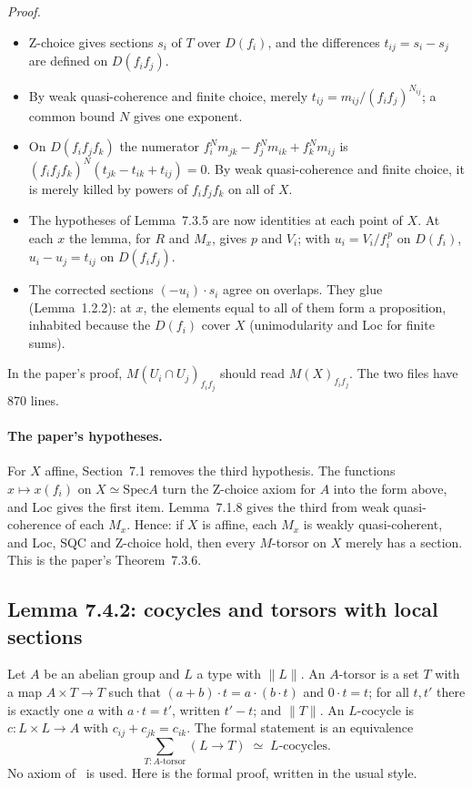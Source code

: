 \documentclass[11pt]{article}
\newcommand{\tr}[1]{\lVert #1\rVert}
\newcommand{\Spec}{\mathrm{Spec}}
\theoremstyle{remark}
\begin{document}
\emph{Proof.}
\begin{itemize}
\item Z-choice gives sections $s_i$ of $T$ over $D(f_i)$, and the
  differences $t_{ij}=s_i-s_j$ are defined on $D(f_if_j)$.
\item By weak quasi-coherence and finite choice, merely
  $t_{ij}=m_{ij}/(f_if_j)^{N_{ij}}$; a common bound $N$ gives one
  exponent.
\item On $D(f_if_jf_k)$ the numerator
  $f_i^Nm_{jk}-f_j^Nm_{ik}+f_k^Nm_{ij}$ is
  $(f_if_jf_k)^N(t_{jk}-t_{ik}+t_{ij})=0$. By weak quasi-coherence and
  finite choice, it is merely killed by powers of $f_if_jf_k$ on all of
  $X$.
\item The hypotheses of Lemma~7.3.5 are now identities at each point
  of $X$. At each $x$ the lemma, for $R$ and $M_x$, gives $p$ and $V_i$;
  with $u_i=V_i/f_i^{\,p}$ on $D(f_i)$, $u_i-u_j=t_{ij}$ on
  $D(f_if_j)$.
\item The corrected sections $(-u_i)\cdot s_i$ agree on overlaps. They
  glue (Lemma~1.2.2): at $x$, the elements equal to all of them form a
  proposition, inhabited because the $D(f_i)$ cover $X$ (unimodularity
  and Loc for finite sums).
\end{itemize}
In the paper's proof, $M(U_i\cap U_j)_{f_if_j}$ should read
$M(X)_{f_if_j}$. The two files have 870 lines.

\paragraph{The paper's hypotheses.} For $X$ affine, Section~7.1 removes
the third hypothesis. The functions $x\mapsto x(f_i)$ on $X\simeq\Spec A$
turn the Z-choice axiom for $A$ into the form above, and Loc gives the
first item. Lemma~7.1.8 gives the third from weak quasi-coherence of
each $M_x$. Hence: if $X$ is affine, each $M_x$ is weakly
quasi-coherent, and Loc, SQC and Z-choice hold, then every $M$-torsor
on $X$ merely has a section. This is the paper's Theorem~7.3.6.

\subsection*{Lemma 7.4.2: cocycles and torsors with local sections}

Let $A$ be an abelian group and $L$ a type with $\tr{L}$. An
$A$-torsor is a set $T$ with a map $A\times T\to T$ such that
$(a+b)\cdot t=a\cdot(b\cdot t)$ and $0\cdot t=t$; for all $t,t'$ there
is exactly one $a$ with $a\cdot t=t'$, written $t'-t$; and $\tr{T}$. An
$L$-cocycle is $c:L\times L\to A$ with $c_{ij}+c_{jk}=c_{ik}$. The
formal statement is an equivalence
\[
  \textstyle\sum_{T:A\text{-torsor}} (L\to T) \;\simeq\; L\text{-cocycles}.
\]
No axiom of~\cite{SAG} is used. Here is the formal proof, written in
the usual style.
\end{document}
